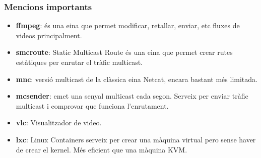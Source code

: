 \subsubsection{Mencions importants}
{
    \begin{itemize}
        \item \textbf{ffmpeg}: és una eina que permet modificar, retallar, enviar, etc fluxes de videos principalment.
        \item \textbf{smcroute}: Static Multicast Route és una eina que permet crear rutes estàtiques per enrutar el tràfic multicast.
        \item \textbf{mnc}: versió multicast de la clàssica eina Netcat, encara bastant més limitada.
        \item \textbf{mcsender}: emet una senyal multicast cada segon. Serveix per enviar tràfic multicast i comprovar que funciona l'enrutament.
        \item \textbf{vlc}: Visualitzador de video.
        \item \textbf{lxc}: Linux Containers serveix per crear una màquina virtual pero sense haver de crear el kernel. Més eficient que una màquina \ac{KVM}.
    \end{itemize}
}
